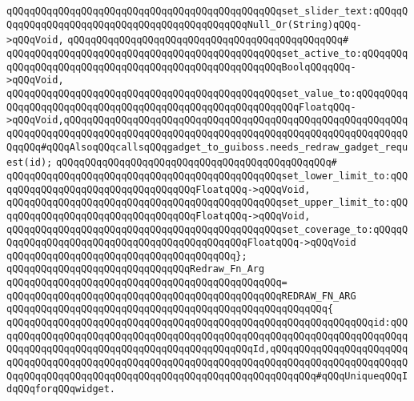 \newline
\verb|qQQqqQQqqQQqqQQqqQQqqQQqqQQqqQQqqQQqqQQqqQQqqQQqset_slider_text:qQQqqQQqqQQqqQQqqQQqqQQqqQQqqQQqqQQqqQQqqQQqqQQqNull_Or(String)qQQq->qQQqVoid,|\newline
\verb|qQQqqQQqqQQqqQQqqQQqqQQqqQQqqQQqqQQqqQQqqQQqqQQq#|\newline
\verb|qQQqqQQqqQQqqQQqqQQqqQQqqQQqqQQqqQQqqQQqqQQqqQQqset_active_to:qQQqqQQqqQQqqQQqqQQqqQQqqQQqqQQqqQQqqQQqqQQqqQQqqQQqqQQqBoolqQQqqQQq->qQQqVoid,|\newline
\verb|qQQqqQQqqQQqqQQqqQQqqQQqqQQqqQQqqQQqqQQqqQQqqQQqset_value_to:qQQqqQQqqQQqqQQqqQQqqQQqqQQqqQQqqQQqqQQqqQQqqQQqqQQqqQQqqQQqFloatqQQq->qQQqVoid,qQQqqQQqqQQqqQQqqQQqqQQqqQQqqQQqqQQqqQQqqQQqqQQqqQQqqQQqqQQqqQQqqQQqqQQqqQQqqQQqqQQqqQQqqQQqqQQqqQQqqQQqqQQqqQQqqQQqqQQqqQQqqQQqqQQqqQQq#qQQqAlsoqQQqcallsqQQqgadget_to_guiboss.needs_redraw_gadget_request(id);|\newline
\verb|qQQqqQQqqQQqqQQqqQQqqQQqqQQqqQQqqQQqqQQqqQQqqQQq#|\newline
\verb|qQQqqQQqqQQqqQQqqQQqqQQqqQQqqQQqqQQqqQQqqQQqqQQqset_lower_limit_to:qQQqqQQqqQQqqQQqqQQqqQQqqQQqqQQqqQQqFloatqQQq->qQQqVoid,|\newline
\verb|qQQqqQQqqQQqqQQqqQQqqQQqqQQqqQQqqQQqqQQqqQQqqQQqset_upper_limit_to:qQQqqQQqqQQqqQQqqQQqqQQqqQQqqQQqqQQqFloatqQQq->qQQqVoid,|\newline
\verb|qQQqqQQqqQQqqQQqqQQqqQQqqQQqqQQqqQQqqQQqqQQqqQQqset_coverage_to:qQQqqQQqqQQqqQQqqQQqqQQqqQQqqQQqqQQqqQQqqQQqqQQqFloatqQQq->qQQqVoid|\newline
\verb|qQQqqQQqqQQqqQQqqQQqqQQqqQQqqQQqqQQqqQQq};|\newline
\newline
\newline
\verb|qQQqqQQqqQQqqQQqqQQqqQQqqQQqqQQqRedraw_Fn_Arg|\newline
\verb|qQQqqQQqqQQqqQQqqQQqqQQqqQQqqQQqqQQqqQQqqQQqqQQq=|\newline
\verb|qQQqqQQqqQQqqQQqqQQqqQQqqQQqqQQqqQQqqQQqqQQqqQQqREDRAW_FN_ARG|\newline
\verb|qQQqqQQqqQQqqQQqqQQqqQQqqQQqqQQqqQQqqQQqqQQqqQQqqQQqqQQq{|\newline
\verb|qQQqqQQqqQQqqQQqqQQqqQQqqQQqqQQqqQQqqQQqqQQqqQQqqQQqqQQqqQQqqQQqid:qQQqqQQqqQQqqQQqqQQqqQQqqQQqqQQqqQQqqQQqqQQqqQQqqQQqqQQqqQQqqQQqqQQqqQQqqQQqqQQqqQQqqQQqqQQqqQQqqQQqqQQqqQQqqQQqqQQqId,qQQqqQQqqQQqqQQqqQQqqQQqqQQqqQQqqQQqqQQqqQQqqQQqqQQqqQQqqQQqqQQqqQQqqQQqqQQqqQQqqQQqqQQqqQQqqQQqqQQqqQQqqQQqqQQqqQQqqQQqqQQqqQQqqQQqqQQqqQQqqQQqqQQq#qQQqUniqueqQQqIdqQQqforqQQqwidget.|\newline
